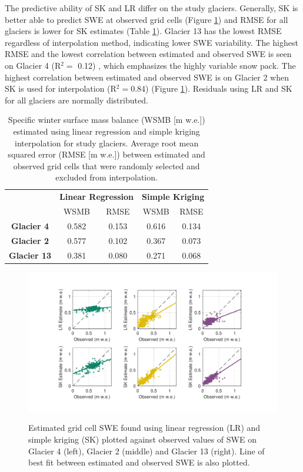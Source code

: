 \documentclass[review,oneside, letterpaper]{igs}
\begin{document}
The predictive ability of SK and LR differ on the study glaciers. Generally, SK is better able to predict SWE at observed grid cells (Figure \ref{fig:observedVSestimated_S2}) and RMSE for all glaciers is lower for SK estimates (Table \ref{tab:WSMB&RMSE}). Glacier 13 has the lowest RMSE regardless of interpolation method, indicating lower SWE variability. The highest RMSE and the lowest correlation between estimated and observed SWE is seen on Glacier 4 (R$^2=$ 0.12) , which emphasizes the highly variable snow pack.  The highest correlation between estimated and observed SWE is on Glacier 2 when SK is used for interpolation (R$^2=$0.84) (Figure \ref{fig:observedVSestimated_S2}). Residuals using LR and SK for all glaciers are normally distributed.

\begin{table}[]
\centering
\caption{Specific winter surface mass balance (WSMB [m w.e.]) estimated using linear regression and simple kriging interpolation for study glaciers. Average root mean squared error (RMSE [m w.e.]) between estimated and observed grid cells that were randomly selected and excluded from interpolation.}
\label{tab:WSMB&RMSE}
\begin{tabular}{ccccc}
 & \multicolumn{2}{c}{\textbf{Linear Regression}} & \multicolumn{2}{c}{\textbf{Simple Kriging}} \\
 & WSMB & RMSE & WSMB & RMSE \\
  \midrule
\textbf{Glacier 4} & 0.582 & 0.153 & 0.616 & 0.134 \\
 \midrule
\textbf{Glacier 2} & 0.577 & 0.102 & 0.367 & 0.073 \\
 \midrule
\textbf{Glacier 13} & 0.381 & 0.080 & 0.271 & 0.068
\end{tabular}
\end{table}

\begin{figure}
	\centering
	\includegraphics[width =\textwidth]{observedVSestimated_S2.pdf}\\
	\caption{Estimated grid cell SWE found using linear regression (LR) and simple kriging (SK) plotted against observed values of SWE on Glacier 4 (left), Glacier 2 (middle) and Glacier 13 (right). Line of best fit between estimated and observed SWE is also plotted.}
	\label{fig:observedVSestimated_S2}
\end{figure}
\end{document}
